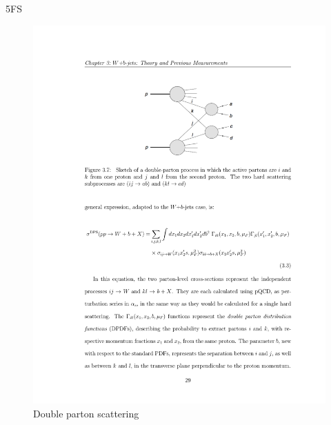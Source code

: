 \par 5FS

\begin{figure}[htbp]
	\centering
		\includegraphics{Figures/DPS_diag.pdf}
	\caption[Double parton scattering]{Double parton scattering}
	\label{fig:DPS_diag}
\end{figure}




